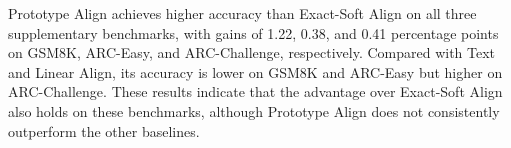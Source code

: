 \documentclass[11pt]{article}
\begin{document}
Prototype Align achieves higher accuracy than Exact-Soft Align on all three supplementary benchmarks, with gains of 1.22, 0.38, and 0.41 percentage points on GSM8K, ARC-Easy, and ARC-Challenge, respectively. Compared with Text and Linear Align, its accuracy is lower on GSM8K and ARC-Easy but higher on ARC-Challenge. These results indicate that the advantage over Exact-Soft Align also holds on these benchmarks, although Prototype Align does not consistently outperform the other baselines.

\end{document}
